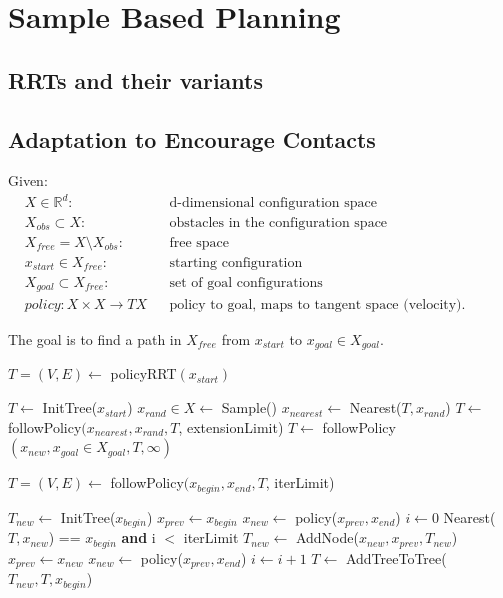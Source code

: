 \documentclass[../thesis.tex]{subfiles}
\begin{document}
\section{Sample Based Planning}
\subsection{RRTs and their variants}
\subsection{Adaptation to Encourage Contacts}
Given:
\begin{align*}
    &X \in \mathbb{R}^d:     &&\text{d-dimensional configuration space}\\
    &X_{obs} \subset X:      &&\text{obstacles in the configuration space}\\
    &X_{free} = X \setminus X_{obs}:   &&\text{free space}\\
    &x_{start} \in X_{free}:  &&\text{starting configuration}\\
    &X_{goal} \subset X_{free}: &&\text{set of goal configurations}\\
    &policy: X \times X \rightarrow TX &&\text{policy to goal, maps to tangent space (velocity).  Previous formulation was wrong, as need to be able to follow the policy to an arbitrary point in X, not just a goal configuration}
\end{align*}

The goal is to find a path in $X_{free}$ from $x_{start}$ to $x_{goal} \in X_{goal}$.


\begin{algorithm}
\caption{$T=(V,E) \leftarrow$ policyRRT$(x_{start})$}\label{euclid}
\begin{algorithmic}[1]
\State $T \leftarrow$ InitTree($x_{start}$)
\State $x_{rand} \in X \leftarrow$ Sample()
\State $x_{nearest} \leftarrow $ Nearest($T, x_{rand}$)
\State $T \leftarrow $ followPolicy$(x_{nearest}, x_{rand}, T$, extensionLimit)
\State $T \leftarrow $ followPolicy$(x_{new}, x_{goal} \in X_{goal}, T, \infty)$
\EndIf
\EndWhile
\end{algorithmic}
\end{algorithm}

\begin{algorithm}
\caption{$T=(V,E) \leftarrow$ followPolicy$(x_{begin}, x_{end}, T$, iterLimit)}\label{euclid}
\begin{algorithmic}[1]
\State $T_{new} \leftarrow $ InitTree($x_{begin}$)
\State $x_{prev} \leftarrow x_{begin}$
\State $x_{new} \leftarrow $ policy($x_{prev}, x_{end}$)
\State $i \leftarrow 0$
\StatexIndent[2] Nearest($T, x_{new}$) == $x_{begin}$ \textbf{and}
\StatexIndent[2] i $<$ iterLimit
\algorithmicdo
\State $T_{new} \leftarrow $ AddNode($x_{new}, x_{prev}, T_{new}$)
\State $x_{prev} \leftarrow x_{new}$ 
\State $x_{new} \leftarrow $ policy($x_{prev}, x_{end}$)
\State $i \leftarrow i+1$
\EndWhile
\State $T \leftarrow $ AddTreeToTree($T_{new}, T, x_{begin}$)
\end{algorithmic}
\end{algorithm}
\end{document}
